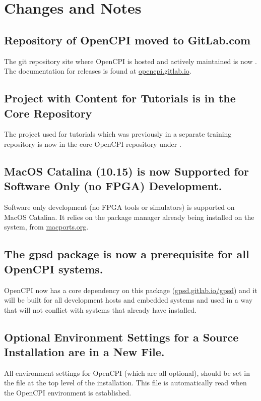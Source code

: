 \section{Changes and Notes}
\subsection{Repository of OpenCPI moved to GitLab.com}
\label{sec:16_repo}
The git repository site where OpenCPI is hosted and actively maintained is now .  The documentation for releases is found at \url{opencpi.gitlab.io}.

\subsection{Project with Content for Tutorials is in the Core Repository}
\label{sec:16_tutorial}
The project used for tutorials which was previously in a separate training repository is now in the core OpenCPI repository under .

\subsection{MacOS Catalina (10.15) is now Supported for Software Only (no FPGA) Development.}
\label{sec:16_macos}
Software only development (no FPGA tools or simulators) is supported on MacOS Catalina.  It relies on the  package manager already being installed on the system, from \url{macports.org}.

\subsection{The gpsd package is now a prerequisite for all OpenCPI systems.}
\label{sec:16_gpsd}
OpenCPI now has a core dependency on this package (\url{gpsd.gitlab.io/gpsd}) and it will be built for all development hosts and embedded systems and used in a way that will not conflict with systems that already have  installed.

\subsection{Optional Environment Settings for a Source Installation are in a New File.}
\label{sec:16_userenv}
All environment settings for OpenCPI (which are all optional), should be set in the  file at the top
level of the installation.  This file is automatically read when the OpenCPI environment is established.

